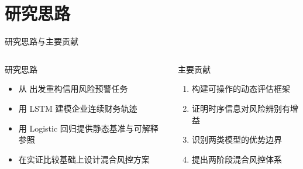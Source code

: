 \section{研究思路}

\begin{frame}{研究思路与主要贡献}
  \begin{columns}[T,onlytextwidth]
    \begin{block}{研究思路}
      \begin{itemize}
        \item 从  出发重构信用风险预警任务
        \item 用 LSTM 建模企业连续财务轨迹
        \item 用 Logistic 回归提供静态基准与可解释参照
        \item 在实证比较基础上设计混合风控方案
      \end{itemize}
    \end{block}

    \begin{exampleblock}{主要贡献}
      \begin{enumerate}
        \item 构建可操作的动态评估框架
        \item 证明时序信息对风险辨别有增益
        \item 识别两类模型的优势边界
        \item 提出两阶段混合风控体系
      \end{enumerate}
    \end{exampleblock}
  \end{columns}
\end{frame}

